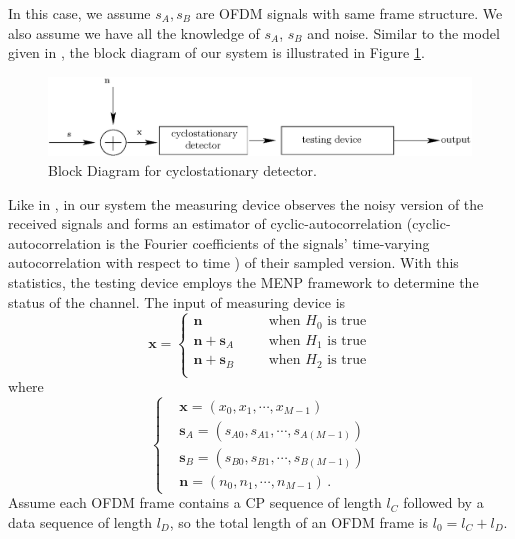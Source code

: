 In this case, we assume $s_A, s_B$ are OFDM signals with same frame structure.
We also assume we have all the knowledge of $s_A$, $s_B$ and noise.   
Similar to the model given in \cite{lunden2007spectrum, lunden2010robust}, the block diagram of our system is illustrated in Figure \ref{pic:1222a0}.
\begin{figure}[!t]
  \centering 
  \includegraphics[width=\textwidth]{4/fig1.eps}
  \caption{Block Diagram for  cyclostationary detector.}
  \label{pic:1222a0}
\end{figure}
Like in \cite{lunden2007spectrum, lunden2010robust}, in our system the measuring device observes the noisy version of the received signals and forms an estimator of cyclic-autocorrelation (cyclic-autocorrelation is the Fourier coefficients of the signals' time-varying autocorrelation with respect to time \cite{lunden2007spectrum, lunden2010robust, dandawate1994statistical}) of their sampled version. With this statistics, the testing device employs the MENP framework to determine the status of the channel. The input of measuring device is
\begin{equation}
  \mathbf{x} = \begin{cases}
	\mathbf{n}\;\;\;\;\;\;&\text{when $H_0$ is true}\\
	\mathbf{n}+\mathbf{s}_A\;\;\;\;\;\;&\text{when $H_1$ is true}\\
	\mathbf{n}+\mathbf{s}_B\;\;\;\;\;\;&\text{when $H_2$ is true}\\
  \end{cases}
  \label{equ:1209a1}
\end{equation}
where 
\begin{equation}
  \begin{cases}
	&\mathbf{x} = (x_0, x_1, \cdots, x_{M-1})\\
	&\mathbf{s}_A = (s_{A0}, s_{A1}, \cdots, s_{A(M-1)})\\
	&\mathbf{s}_B = (s_{B0}, s_{B1}, \cdots, s_{B(M-1)})\\
	&\mathbf{n} = (n_{0}, n_{1}, \cdots, n_{M-1})\,.
  \end{cases}
  \label{xssn}
\end{equation}
Assume each OFDM frame contains a CP sequence of length $l_C$ followed by a data sequence of length $l_D$, so the total length of an OFDM frame is $l_0 = l_C+l_D$. 
